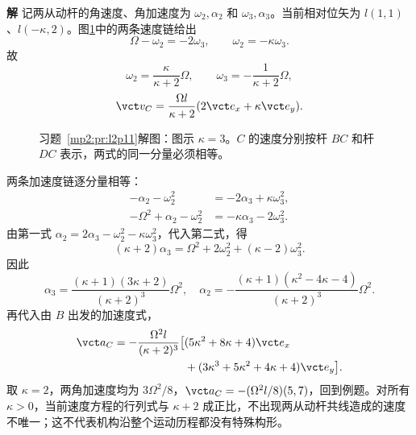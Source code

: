 \documentclass[11pt,openany,fontset=fandol]{ctexbook}
\theoremstyle{definition}\newtheorem{example}{例}[chapter]\newtheorem{exercise}{习题}[chapter]
\newcommand{\SolutionStart}{\par\medskip\ifdim\pagetotal>0pt\ifdim\dimexpr\pagegoal-\pagetotal\relax<3\baselineskip\newpage\fi\fi\noindent\textbf{解}\quad\ignorespaces}
\newenvironment{solution}{\SolutionStart}{\par\medskip}
\begin{document}
\begin{solution}
记两从动杆的角速度、角加速度为 $\omega_2,\alpha_2$ 和 $\omega_3,\alpha_3$。当前相对位矢为 $l(1,1)$、$l(-\kappa,2)$。图\ref{mp2:fig:l2p11-s}中的两条速度链给出
\[
\Omega-\omega_2=-2\omega_3,\qquad \omega_2=-\kappa\omega_3.
\]
故
\[
\omega_2=\frac{\kappa}{\kappa+2}\Omega,\qquad
\omega_3=-\frac1{\kappa+2}\Omega,
\]
\[
\vct v_C=\frac{\Omega l}{\kappa+2}(2\vct e_x+\kappa\vct e_y).
\]

\begin{figure}[H]\centering
{}
\caption{习题~\ref{mp2:pr:l2p11}解图：图示 $\kappa=3$。$C$ 的速度分别按杆 $BC$ 和杆 $DC$ 表示，两式的同一分量必须相等。}\label{mp2:fig:l2p11-s}
\end{figure}

两条加速度链逐分量相等：
\begin{align*}
-\alpha_2-\omega_2^2&=-2\alpha_3+\kappa\omega_3^2,\\
-\Omega^2+\alpha_2-\omega_2^2&=-\kappa\alpha_3-2\omega_3^2.
\end{align*}
由第一式 $\alpha_2=2\alpha_3-\omega_2^2-\kappa\omega_3^2$，代入第二式，得
\[
(\kappa+2)\alpha_3=\Omega^2+2\omega_2^2+(\kappa-2)\omega_3^2.
\]
因此
\[
\alpha_3=\frac{(\kappa+1)(3\kappa+2)}{(\kappa+2)^3}\Omega^2,
\quad
\alpha_2=-\frac{(\kappa+1)(\kappa^2-4\kappa-4)}{(\kappa+2)^3}\Omega^2.
\]
再代入由 $B$ 出发的加速度式，
\[
\begin{split}
\vct a_C=-\frac{\Omega^2l}{(\kappa+2)^3}\bigl[&(5\kappa^2+8\kappa+4)\vct e_x\\
&+(3\kappa^3+5\kappa^2+4\kappa+4)\vct e_y\bigr].
\end{split}
\]
取 $\kappa=2$，两角加速度均为 $3\Omega^2/8$，$\vct a_C=-(\Omega^2l/8)(5,7)$，回到例题。对所有 $\kappa>0$，当前速度方程的行列式与 $\kappa+2$ 成正比，不出现两从动杆共线造成的速度不唯一；这不代表机构沿整个运动历程都没有特殊构形。

\end{solution}
\end{document}
